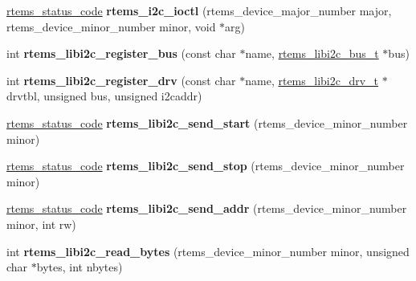 \begin{DoxyCompactItemize}
\item 
\mbox{\label{group__libi2c_gaa6012c48bc798fdea34e97145b4fcc3c}} 
\mbox{\hyperlink{group__ClassicStatus_ga545d41846817eaba6143d52ee4d9e9fe}{rtems\+\_\+status\+\_\+code}} {\bfseries rtems\+\_\+i2c\+\_\+ioctl} (rtems\+\_\+device\+\_\+major\+\_\+number major, rtems\+\_\+device\+\_\+minor\+\_\+number minor, void $\ast$arg)
\item 
\mbox{\label{group__libi2c_gac765ccf209d4eab1b79a83cdbac2dadb}} 
int {\bfseries rtems\+\_\+libi2c\+\_\+register\+\_\+bus} (const char $\ast$name, \mbox{\hyperlink{structrtems__libi2c__bus__t__}{rtems\+\_\+libi2c\+\_\+bus\+\_\+t}} $\ast$bus)
\item 
\mbox{\label{group__libi2c_gacf604bc12f2a5aae78bac019621d3944}} 
int {\bfseries rtems\+\_\+libi2c\+\_\+register\+\_\+drv} (const char $\ast$name, \mbox{\hyperlink{structrtems__libi2c__drv__t__}{rtems\+\_\+libi2c\+\_\+drv\+\_\+t}} $\ast$drvtbl, unsigned bus, unsigned i2caddr)
\item 
\mbox{\label{group__libi2c_ga42677696b55e664a338adae5bae114d0}} 
\mbox{\hyperlink{group__ClassicStatus_ga545d41846817eaba6143d52ee4d9e9fe}{rtems\+\_\+status\+\_\+code}} {\bfseries rtems\+\_\+libi2c\+\_\+send\+\_\+start} (rtems\+\_\+device\+\_\+minor\+\_\+number minor)
\item 
\mbox{\label{group__libi2c_gac514389804ac68e1c25144bae6ccf271}} 
\mbox{\hyperlink{group__ClassicStatus_ga545d41846817eaba6143d52ee4d9e9fe}{rtems\+\_\+status\+\_\+code}} {\bfseries rtems\+\_\+libi2c\+\_\+send\+\_\+stop} (rtems\+\_\+device\+\_\+minor\+\_\+number minor)
\item 
\mbox{\label{group__libi2c_gab9530ceab30868d37773150fc34131ee}} 
\mbox{\hyperlink{group__ClassicStatus_ga545d41846817eaba6143d52ee4d9e9fe}{rtems\+\_\+status\+\_\+code}} {\bfseries rtems\+\_\+libi2c\+\_\+send\+\_\+addr} (rtems\+\_\+device\+\_\+minor\+\_\+number minor, int rw)
\item 
\mbox{\label{group__libi2c_ga0c02facb72453e19d6a0e9524f379573}} 
int {\bfseries rtems\+\_\+libi2c\+\_\+read\+\_\+bytes} (rtems\+\_\+device\+\_\+minor\+\_\+number minor, unsigned char $\ast$bytes, int nbytes)

\end{DoxyCompactItemize}
